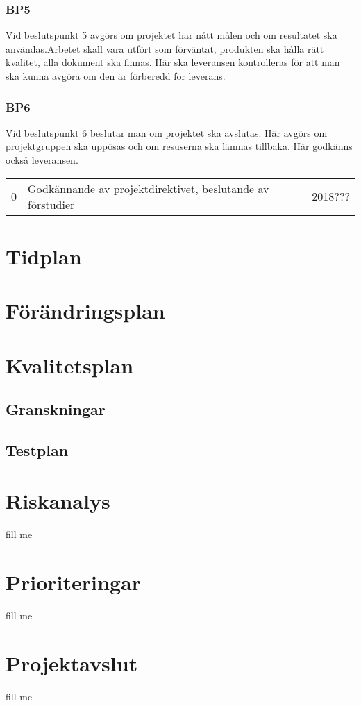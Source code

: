 \documentclass[projektplan/plan.tex]{subfiles}
\begin{document}
\subsubsection*{BP5}
Vid beslutspunkt 5 avgörs om projektet har nått målen och om resultatet ska
användas.Arbetet skall vara utfört som förväntat, produkten ska hålla rätt
kvalitet, alla dokument ska finnas. Här ska leveransen kontrolleras för att man
ska kunna avgöra om den är förberedd för leverans.

\subsubsection*{BP6}
Vid beslutspunkt 6 beslutar man om projektet ska avslutas. Här avgörs om
projektgruppen ska uppösas och om resuserna ska lämnas tillbaka. Här godkänns
också leveransen.

\begin{center}
    \begin{tabular}{| l | l | l |}
    0 & Godkännande av projektdirektivet, beslutande av förstudier & 2018??? 
    \end{tabular}
\end{center}    

\newpage



\section{Tidplan}

\section{Förändringsplan}

\section{Kvalitetsplan}
\subsection{Granskningar}
\subsection{Testplan}


\section{Riskanalys}
fill me

\section{Prioriteringar}
fill me

\section{Projektavslut}
fill me
\end{document}
